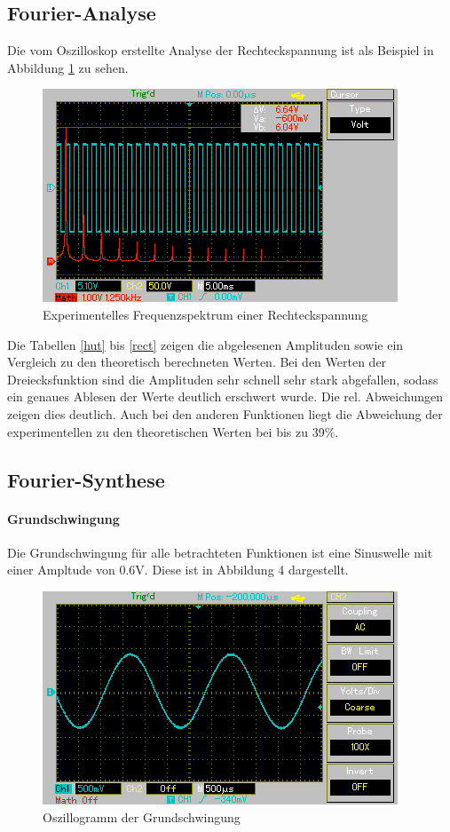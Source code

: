 \documentclass[11pt,ngerman,a4paper]{article}
\begin{document}
\subsection{Fourier-Analyse}
Die vom Oszilloskop erstellte Analyse der Rechteckspannung ist als Beispiel in Abbildung \ref{recht} zu sehen.
\begin{figure}[htp]
\centering
\includegraphics[scale=0.8]{Screenshots/MAP001.png}
\caption{Experimentelles Frequenzspektrum einer Rechteckspannung}
\label{recht}
\end{figure}
Die Tabellen \ref{hut} bis \ref{rect} zeigen die abgelesenen Amplituden sowie ein Vergleich zu den theoretisch berechneten Werten. Bei den Werten der Dreiecksfunktion sind die Amplituden sehr schnell sehr stark abgefallen, sodass ein genaues Ablesen der Werte deutlich erschwert wurde. Die rel. Abweichungen zeigen dies deutlich. Auch bei den anderen Funktionen liegt die Abweichung der experimentellen zu den theoretischen Werten bei bis zu 39\%.
\subsection{Fourier-Synthese} 
\paragraph{Grundschwingung} Die Grundschwingung f\"ur alle betrachteten Funktionen ist eine Sinuswelle mit einer Ampltude von $0.6$V. Diese ist in Abbildung 4 dargestellt.
\begin{figure}[h]
\centering
\includegraphics[scale=0.8]{Screenshots/basic.png}
\caption{Oszillogramm der Grundschwingung}

\end{figure}
\end{document}
